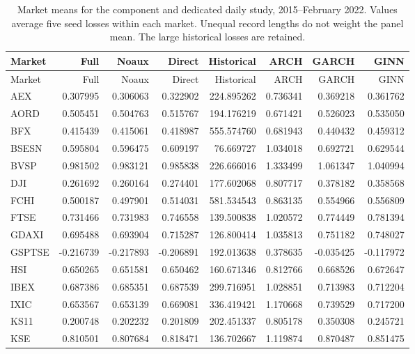 \begingroup\footnotesize\setlength{\tabcolsep}{3pt}
\begin{longtable}{@{}lrrrrrrr@{}}
\caption[Training-component gains by market]{Market means for the component and dedicated daily study, 2015--February 2022. Values average five seed losses within each market. Unequal record lengths do not weight the panel mean. The large historical losses are retained.}\label{tab:new-programme-markets}\\
\toprule
Market & Full & Noaux & Direct & Historical & ARCH & GARCH & GINN \\
\midrule\endfirsthead
\toprule
Market & Full & Noaux & Direct & Historical & ARCH & GARCH & GINN \\
\midrule\endhead
AEX & 0.307995 & 0.306063 & 0.322902 & 224.895262 & 0.736341 & 0.369218 & 0.361762 \\
AORD & 0.505451 & 0.504763 & 0.515767 & 194.176219 & 0.671421 & 0.526023 & 0.535050 \\
BFX & 0.415439 & 0.415061 & 0.418987 & 555.574760 & 0.681943 & 0.440432 & 0.459312 \\
BSESN & 0.595804 & 0.596475 & 0.609197 & 76.669727 & 1.034018 & 0.692721 & 0.629544 \\
BVSP & 0.981502 & 0.983121 & 0.985838 & 226.666016 & 1.333499 & 1.061347 & 1.040994 \\
DJI & 0.261692 & 0.260164 & 0.274401 & 177.602068 & 0.807717 & 0.378182 & 0.358568 \\
FCHI & 0.500187 & 0.497901 & 0.514031 & 581.534543 & 0.863135 & 0.554966 & 0.556809 \\
FTSE & 0.731466 & 0.731983 & 0.746558 & 139.500838 & 1.020572 & 0.774449 & 0.781394 \\
GDAXI & 0.695488 & 0.693904 & 0.715287 & 126.800414 & 1.035813 & 0.751182 & 0.748027 \\
GSPTSE & -0.216739 & -0.217893 & -0.206891 & 192.013638 & 0.378635 & -0.035425 & -0.117972 \\
HSI & 0.650265 & 0.651581 & 0.650462 & 160.671346 & 0.812766 & 0.668526 & 0.672647 \\
IBEX & 0.687386 & 0.685351 & 0.687539 & 299.716951 & 1.028851 & 0.713983 & 0.712204 \\
IXIC & 0.653567 & 0.653139 & 0.669081 & 336.419421 & 1.170668 & 0.739529 & 0.717200 \\
KS11 & 0.200748 & 0.202232 & 0.201809 & 202.451337 & 0.805178 & 0.350308 & 0.245721 \\
KSE & 0.810501 & 0.807684 & 0.818471 & 136.702667 & 1.119874 & 0.870487 & 0.851475 \\

\end{longtable}

